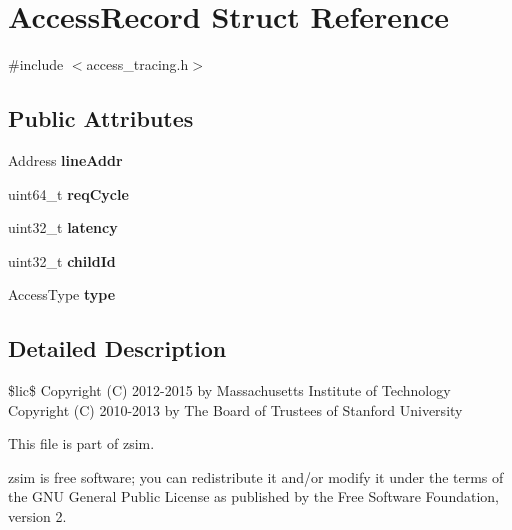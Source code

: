 \hypertarget{structAccessRecord}{\section{Access\-Record Struct Reference}
\label{structAccessRecord}
}


{\ttfamily \#include $<$access\-\_\-tracing.\-h$>$}

\subsection*{Public Attributes}
\begin{DoxyCompactItemize}
\item 
\hypertarget{structAccessRecord_a509d9317d3f62310b5d97821248724cb}{Address {\bfseries line\-Addr}}\label{structAccessRecord_a509d9317d3f62310b5d97821248724cb}

\item 
\hypertarget{structAccessRecord_a44559713e3fc31a54355f8cff17e0d73}{uint64\-\_\-t {\bfseries req\-Cycle}}\label{structAccessRecord_a44559713e3fc31a54355f8cff17e0d73}

\item 
\hypertarget{structAccessRecord_a9f35a59563ab24e6c0bf1d2cd0c5f948}{uint32\-\_\-t {\bfseries latency}}\label{structAccessRecord_a9f35a59563ab24e6c0bf1d2cd0c5f948}

\item 
\hypertarget{structAccessRecord_a3d253a30c444993068d32cf8f6d37f55}{uint32\-\_\-t {\bfseries child\-Id}}\label{structAccessRecord_a3d253a30c444993068d32cf8f6d37f55}

\item 
\hypertarget{structAccessRecord_afd3fa6dd689fa869643a56026393621b}{Access\-Type {\bfseries type}}\label{structAccessRecord_afd3fa6dd689fa869643a56026393621b}

\end{DoxyCompactItemize}


\subsection{Detailed Description}
\$lic\$ Copyright (C) 2012-\/2015 by Massachusetts Institute of Technology Copyright (C) 2010-\/2013 by The Board of Trustees of Stanford University

This file is part of zsim.

zsim is free software; you can redistribute it and/or modify it under the terms of the G\-N\-U General Public License as published by the Free Software Foundation, version 2.

